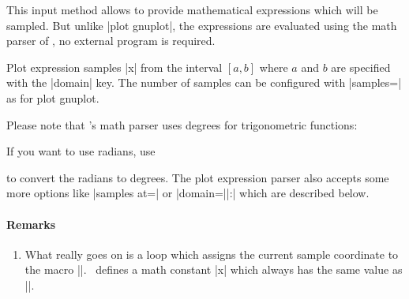 \begin{addplotoperation}[]{}{}
	This input method allows to provide mathematical expressions which will be sampled. But unlike |plot gnuplot|, the expressions are evaluated using the math parser of \PGF, no external program is required.

	Plot expression samples |x| from the interval $[a,b]$ where $a$ and $b$ are specified with the |domain| key. The number of samples can be configured with |samples=| as for plot gnuplot.

\begin{codeexample}[]
\end{codeexample}

Please note that \PGF's math parser uses degrees for trigonometric functions:
\begin{codeexample}[]
\end{codeexample}
\noindent If you want to use radians, use 
\begin{codeexample}[]
\end{codeexample}
\noindent to convert the radians to degrees. The plot expression parser also accepts some more options like |samples at=| or |domain=||:| which are described below.

\paragraph{Remarks}
\begin{enumerate} 
	\item What really goes on is a loop which assigns the current sample coordinate to the macro |\x|. \PGFPlots\ defines a math constant |x| which always has the same value as |\x|.


\end{enumerate}
\end{addplotoperation}
